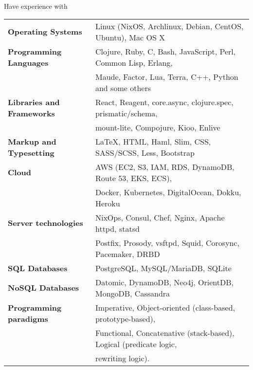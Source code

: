 \documentclass{resume} %
\begin{document}
\begin{rSection}{Have experience with}

\begin{tabular}{ @{} >{\bfseries}l @{\hspace{6ex}} l }
Operating Systems     & Linux (NixOS, Archlinux, Debian, CentOS, Ubuntu), Mac OS X \smallskip \\
Programming Languages & Clojure, Ruby, C, Bash, JavaScript, Perl, Common Lisp, Erlang, \\
                      & Maude, Factor, Lua, Terra, C++, Python and some others \smallskip \\
Libraries and Frameworks & React, Reagent, core.async, clojure.spec, prismatic/schema, \\
                      & mount-lite, Compojure, Kioo, Enlive
                      \smallskip \\
Markup and Typesetting & \LaTeX, HTML, Haml, Slim, CSS, SASS/SCSS, Less, Bootstrap \smallskip \\
Cloud                 & AWS (EC2, S3, IAM, RDS, DynamoDB, Route 53, EKS, ECS), \\
                      & Docker, Kubernetes, DigitalOcean, Dokku, Heroku \smallskip \\
Server technologies   & NixOps, Consul, Chef, Nginx, Apache httpd, statsd \\
                      & Postfix, Prosody, vsftpd, Squid, Corosync, Pacemaker, DRBD \smallskip \\
SQL Databases & PostgreSQL, MySQL/MariaDB, SQLite \smallskip \\
  NoSQL Databases & Datomic, DynamoDB, Neo4j, OrientDB, MongoDB, Cassandra \smallskip \\
Programming paradigms & Imperative, Object-oriented (class-based, prototype-based), \\
                      & Functional, Concatenative (stack-based), Logical (predicate logic, \\
                      & rewriting logic).
\end{tabular}

\end{rSection}

\end{document}
